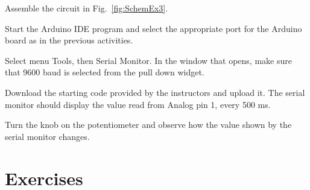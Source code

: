 \documentclass[12pt]{book}
\begin{document}
\begin{compactitem}[--]
\item Assemble the circuit in Fig.~\ref*{fig:SchemEx3}.
\item Start the Arduino IDE program and select the appropriate port
  for the Arduino board as in the previous activities.
\item Select menu Tools, then Serial Monitor. In the window that
  opens, make sure that 9600 baud is selected from the pull down widget.
\item Download the starting code provided by the instructors and
  upload it. The serial monitor should display the value read from Analog
  pin 1, every 500 ms.
\item Turn the knob on the potentiometer and observe how the value
  shown by the serial monitor changes.
\end{compactitem}

\section{Exercises}\label{exercises:ch3}
\end{document}
